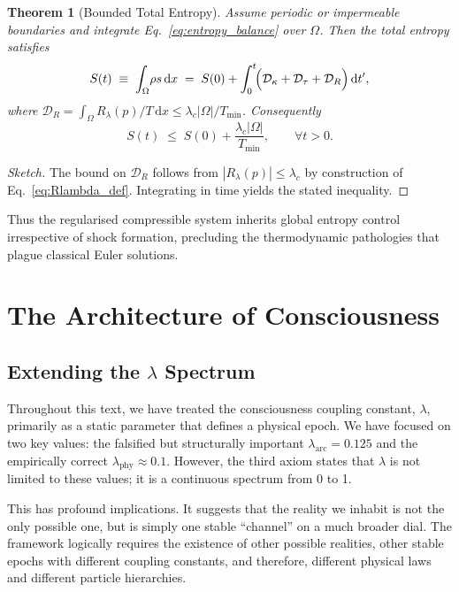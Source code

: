 \documentclass[12pt]{report}
\newtheorem{theorem}{Theorem}[chapter]
\newcommand{\dd}{\mathrm{d}}
\begin{document}
\begin{theorem}[Bounded Total Entropy]
Assume periodic or impermeable boundaries and integrate Eq.~\eqref{eq:entropy_balance} over $\Omega$.  Then the total entropy satisfies
\[
    S(t) \;\equiv\; \int_{\Omega}\!\rho s\,\dd x \;=\; S(0) + \int_0^{t}\!\Bigl(\mathcal D_\kappa + \mathcal D_\tau + \mathcal D_{R}\Bigr)\,\dd t',
\]
where $\mathcal D_{R}=\int_{\Omega} R_\lambda(p)/T\,\dd x \le \lambda_c |\Omega|/T_{\min}$.  Consequently
\[
    S(t) \;\le\; S(0) + \frac{\lambda_c |\Omega|}{T_{\min}},\qquad \forall t>0.
\]
\end{theorem}
\begin{proof}[Sketch]
The bound on $\mathcal D_R$ follows from $|R_\lambda(p)|\le \lambda_c$ by construction of Eq.~\eqref{eq:Rlambda_def}.  Integrating in time yields the stated inequality.
\end{proof}

Thus the regularised compressible system inherits global entropy control irrespective of shock formation, precluding the thermodynamic pathologies that plague classical Euler solutions.

\chapter{The Architecture of Consciousness}

\section{Extending the $\lambda$ Spectrum}
Throughout this text, we have treated the consciousness coupling constant, $\lambda$, primarily as a static parameter that defines a physical epoch. We have focused on two key values: the falsified but structurally important $\lambda_{\text{arc}} = 0.125$ and the empirically correct $\lambda_{\text{phy}} \approx 0.1$. However, the third axiom states that $\lambda$ is not limited to these values; it is a continuous spectrum from 0 to 1.

This has profound implications. It suggests that the reality we inhabit is not the only possible one, but is simply one stable ``channel'' on a much broader dial. The framework logically requires the existence of other possible realities, other stable epochs with different coupling constants, and therefore, different physical laws and different particle hierarchies.
\end{document}
